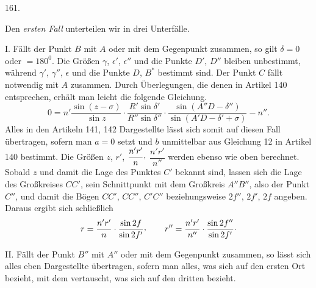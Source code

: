 \par{}\medskip
{}\begin{center}\hypertarget{native-224-article161}{}161.\end{center}
Den \emph{ersten Fall} unterteilen wir in drei Unterfälle.

I. Fällt der Punkt $B$ mit $A$ oder mit dem Gegenpunkt zusammen, so gilt $\delta=0$ oder $=180^0$. Die Größen $\gamma$, $\epsilon'$, $\epsilon''$ und die Punkte $D'$, $D''$ bleiben unbestimmt, während $\gamma'$, $\gamma''$, $\epsilon$ und die Punkte $D$, $B^*$ bestimmt sind. Der Punkt $C$ fällt notwendig mit $A$ zusammen. Durch Überlegungen, die denen in Artikel 140 entsprechen, erhält man leicht die folgende Gleichung.
\[
0=n'\frac{\sin(z-\sigma)}{\sin z}\cdot\frac{R'\sin\delta'}{R''\sin\delta''}
\cdot\frac{\sin(A''D-\delta'')}{\sin(A'D-\delta'+\sigma)}-n''.
\]
Alles in den Artikeln 141, 142 Dargestellte lässt sich somit auf diesen Fall übertragen, sofern man $a=0$ setzt und $b$ unmittelbar aus Gleichung 12 in Artikel 140 bestimmt. Die Größen $z$, $r'$, $\dfrac{n'r'}{n}\mathpunct{\raisebox{.45ex}{,}}$
$\dfrac{n'r'}{n''}$ werden ebenso wie oben berechnet. Sobald $z$ und damit die Lage des Punktes $C'$ bekannt sind, lassen sich die Lage des Großkreises $CC'$, sein Schnittpunkt mit dem Großkreis $A''B''$, also der Punkt $C''$, und damit die Bögen $CC'$, $CC''$, $C'C''$ beziehungsweise $2f''$, $2f'$, $2f$ angeben. Daraus ergibt sich schließlich
\[
r=\frac{n'r'}{n}\cdot\frac{\sin2f}{\sin2f'}\mathpunct{\raisebox{.45ex}{,}}\qquad
r''=\frac{n'r'}{n''}\cdot\frac{\sin2f''}{\sin2f'}\mathpunct{\cdot}
\]

II. Fällt der Punkt $B''$ mit $A''$ oder mit dem Gegenpunkt zusammen, so lässt sich alles eben Dargestellte übertragen, sofern man alles, was sich auf den ersten Ort bezieht, mit dem vertauscht, was sich auf den dritten bezieht.

